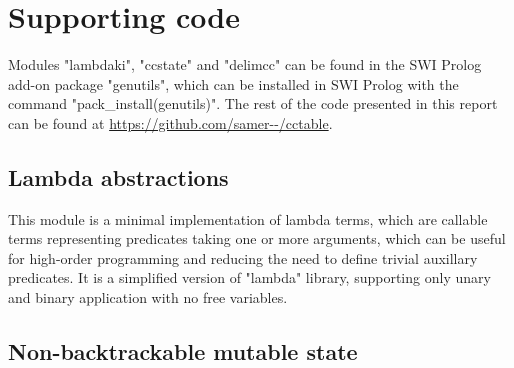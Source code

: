 \section{Supporting code}

Modules "lambdaki", "ccstate" and "delimcc" can be found in the SWI Prolog
add-on package "genutils", which can be installed in SWI Prolog with the command
"pack_install(genutils)". The rest of the code presented in this report can be
found at \url{https://github.com/samer--/cctable}.

\subsection{Lambda abstractions}
\label{sec:lambdaki}

This module is a minimal implementation of lambda terms, which are callable terms representing
predicates taking one or more arguments, which can be useful for high-order programming and
reducing the need to define trivial auxillary predicates. It is a simplified version of 
 "lambda" library,
supporting only unary and binary application with no free variables.


\subsection{Non-backtrackable mutable state}
\label{app:ccnbstate}

